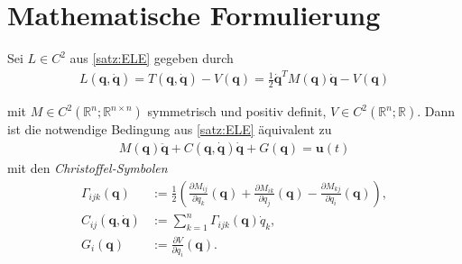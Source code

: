 \documentclass[a4paper, 12pt]{scrartcl}
\begin{document}
\section{Mathematische Formulierung}

\begin{satz}%
    \label{satz:christoffel}
    Sei $L \in C^2$ aus \ref{satz:ELE} gegeben durch
    \begin{align*}
        L(\bm{q},\bm{\dot{q}}) 
        = 
        T(\bm{q},\bm{\dot{q}}) - V(\bm{q})
        =
        \frac{1}{2} \bm{\dot{q}}^T M(\bm{q}) \bm{\dot{q}} - V(\bm{q})
    \end{align*}
    
    mit $M \in C^2(\mathbb{R}^n; \mathbb{R}^{n \times n})$ symmetrisch und
    positiv definit, $V \in C^2(\mathbb{R}^n; \mathbb{R})$. 
    Dann ist die notwendige Bedingung aus \ref{satz:ELE} äquivalent zu
    \begin{align*}
        M(\bm{q}) \ddot{\bm{q}}
        +
        C(\bm{q},\bm{\dot{q}}) \bm{\dot{q}}
        +
        G(\bm{q})
        =
        \bm{u}(t)
    \end{align*}
    mit den \emph{Christoffel-Symbolen}
    \begin{align*}
        \Gamma_{ijk}(\bm{q})
        &:=
        \frac{1}{2}
        \left(
            \frac{\partial M_{ij}}{\partial q_k}(\bm{q})
            +
            \frac{\partial M_{ik}}{\partial q_j}(\bm{q})
            -
            \frac{\partial M_{kj}}{\partial q_i}(\bm{q})
        \right),
        \\
        C_{ij}(\bm{q},\bm{\dot{q}})
        &:=
        \sum_{k=1}^n \Gamma_{ijk}(\bm{q}) \dot{q}_k,
        \\
        G_i(\bm{q})
        &:=
        \frac{\partial V}{\partial q_i}(\bm{q}).
    \end{align*}
\end{satz}
\end{document}
